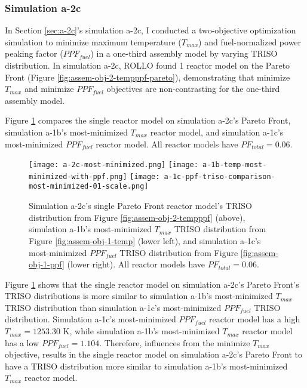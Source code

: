 \subsubsection{Simulation a-2c}
In Section \ref{sec:a-2c}'s simulation a-2c, I conducted a two-objective 
optimization simulation to minimize maximum temperature ($T_{max}$) and fuel-normalized 
power peaking factor ($PPF_{fuel}$) in a one-third assembly model by varying 
TRISO distribution. 
In simulation a-2c, ROLLO found 1 reactor model on the Pareto Front (Figure 
\ref{fig:assem-obj-2-tempppf-pareto}), demonstrating that minimize $T_{max}$ and 
minimize $PPF_{fuel}$ objectives are non-contrasting for the one-third assembly model. 

Figure \ref{fig:a-2c-triso-comparison} compares the single reactor model on simulation 
a-2c's Pareto Front, simulation a-1b's most-minimized $T_{max}$ reactor model, and 
simulation a-1c's most-minimized $PPF_{fuel}$ reactor model. 
All reactor models have $PF_{total}=0.06$.
\begin{figure}[htbp!]
    \centering
    \texttt{[image: a-2c-most-minimized.png]} 
    \texttt{[image: a-1b-temp-most-minimized-with-ppf.png]} 
    \texttt{[image: a-1c-ppf-triso-comparison-most-minimized-01-scale.png]} 
    \caption{Simulation a-2c's single Pareto Front reactor model's TRISO distribution 
    from Figure \ref{fig:assem-obj-2-tempppf} (above), simulation a-1b's most-minimized 
    $T_{max}$ TRISO distribution from Figure \ref{fig:assem-obj-1-temp} (lower left), and 
    simulation a-1c's most-minimized $PPF_{fuel}$ TRISO distribution from Figure 
    \ref{fig:assem-obj-1-ppf} (lower right).
    All reactor models have $PF_{total}=0.06$.}
    \label{fig:a-2c-triso-comparison}
\end{figure}

Figure \ref{fig:a-2c-triso-comparison} shows that the single reactor model on simulation 
a-2c's Pareto Front's TRISO distributions is more similar to simulation a-1b's 
most-minimized $T_{max}$ TRISO distribution than simulation a-1c's most-minimized 
$PPF_{fuel}$ TRISO distribution. 
Simulation a-1c's most-minimized $PPF_{fuel}$ reactor model has a high $T_{max}=1253.30$ 
K, while simulation a-1b's most-minimized $T_{max}$ reactor model has a low 
$PPF_{fuel}=1.104$. 
Therefore, influences from the minimize $T_{max}$ objective, results in the single 
reactor model on simulation a-2c's Pareto Front to have a TRISO distribution more 
similar to simulation a-1b's most-minimized $T_{max}$ reactor model. 

